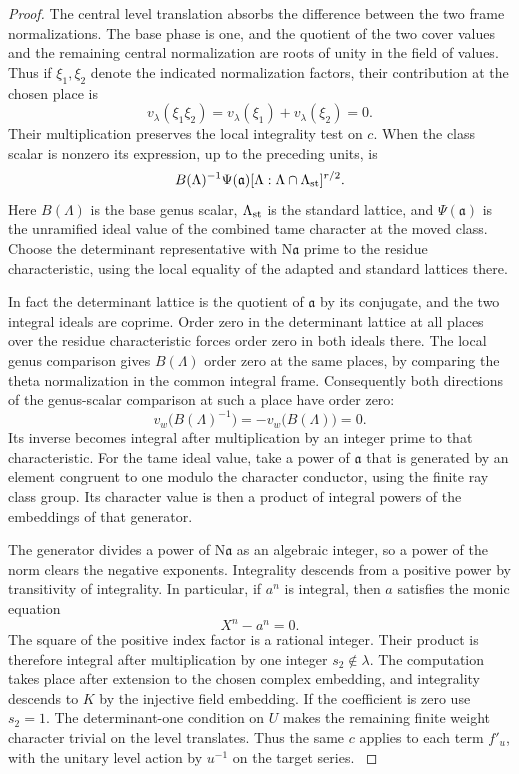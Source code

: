 \begin{proof}
The central level translation absorbs the difference
between the two frame normalizations. The base phase is
one, and the quotient of the two cover values and the
remaining central normalization are roots of unity in the field of values.
Thus if \(\xi_1,\xi_2\) denote the indicated normalization factors, their contribution at the chosen place is
\[
  v_\lambda(\xi_1\xi_2)=v_\lambda(\xi_1)+v_\lambda(\xi_2)=0 .
\]
 Their multiplication preserves the
local integrality test on \(c\). When the class
scalar is nonzero its expression, up to the preceding
units, is
\[
    B(\Lambda)^{-1}\Psi(\mathfrak a)
       [\Lambda:\Lambda\cap\Lambda_{\rm st}]^{r/2}.
\]
Here \(B(\Lambda)\) is the base genus scalar,
\(\Lambda_{\rm st}\) is the standard lattice, and
\(\Psi(\mathfrak a)\) is the unramified ideal value
of the combined tame character at the moved class.
Choose the determinant representative with
\(\mathrm N\mathfrak a\) prime to the residue
characteristic, using the local equality of the
adapted and standard lattices there.

In fact the determinant
lattice is the quotient of \(\mathfrak a\) by its conjugate,
and the two integral ideals are coprime. Order zero in
the determinant lattice at all places over the residue
characteristic forces order zero in both ideals there.
The local genus comparison gives \(B(\Lambda)\) order zero
at the same places, by comparing the theta normalization
in the common integral frame.
Consequently both directions of the genus-scalar comparison at such a place have order zero:
\[
  v_w\big(B(\Lambda)^{-1}\big)=-v_w\big(B(\Lambda)\big)=0 .
\]
 Its inverse becomes integral
after multiplication by an integer prime to that
characteristic. For the tame ideal value, take a power
of \(\mathfrak a\) that is generated by an element
congruent to one modulo the character conductor, using
the finite ray class group. Its character value is then
a product of integral powers of the embeddings of that
generator.

The generator divides a power of
\(\mathrm N\mathfrak a\) as an algebraic integer, so a
power of the norm clears the negative exponents.
Integrality descends from a positive power by
transitivity of integrality.
In particular, if \(a^n\) is integral, then \(a\) satisfies the monic equation
\[
  X^n-a^n=0.
\]
 The square of the positive
index factor is a rational integer. Their product is
therefore integral after multiplication by one integer
\(s_2\notin\lambda\). The computation takes place after extension to the chosen complex embedding, and integrality descends to \(K\) by
the injective field embedding. If the coefficient
is zero use \(s_2=1\).
The determinant-one condition on \(U\) makes the
remaining finite weight character trivial on the level
translates. Thus the same \(c\) applies to each term
\(f'_u\), with the unitary level action by \(u^{-1}\) on
the target series.
\label{cor:paired-off-prime-trace-6}


\end{proof}
